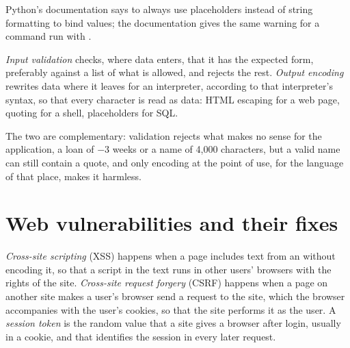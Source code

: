 Python's  documentation says to always use placeholders instead of string formatting to bind values; the  documentation gives the same warning for a command run with . %

\label{out:b3:software-security:cmd}

\begin{definition}\label{def:b3:software-security:validation}
\emph{Input validation} checks, where data enters, that it has the expected form, preferably against a list of what is allowed, and rejects the rest. \emph{Output encoding} rewrites data where it leaves for an interpreter, according to that interpreter's syntax, so that every character is read as data: HTML escaping for a web page, quoting for a shell, placeholders for SQL.
\end{definition}

The two are complementary: validation rejects what makes no sense for the application, a loan of $-3$ weeks or a name of 4,000 characters, but a valid name can still contain a quote, and only encoding at the point of use, for the language of that place, makes it harmless.

\section{Web vulnerabilities and their fixes}\label{sec:b3:software-security:web}

\begin{definition}\label{def:b3:software-security:web}
\emph{Cross-site scripting} (XSS) happens when a page includes text from an  without encoding it, so that a script in the text runs in other users' browsers with the rights of the site. \emph{Cross-site request forgery} (CSRF) happens when a page on another site makes a user's browser send a request to the site, which the browser accompanies with the user's cookies, so that the site performs it as the user. A \emph{session token} is the random value that a site gives a browser after login, usually in a cookie, and that identifies the session in every later request.
\end{definition}

